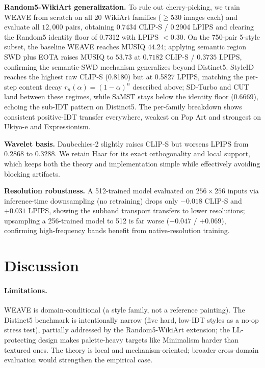 \documentclass[letterpaper]{article}
\begin{document}
\textbf{Random5-WikiArt generalization.}
To rule out cherry-picking, we train WEAVE from scratch on all 20 WikiArt families ($\ge$530 images each) and evaluate all $12{,}000$ pairs, obtaining 0.7434 CLIP-S / 0.2904 LPIPS and clearing the Random5 identity floor of 0.7312 with LPIPS $<0.30$.
On the 750-pair 5-style subset, the baseline WEAVE reaches MUSIQ $44.24$; applying semantic region SWD plus EOTA raises MUSIQ to $53.73$ at $0.7182$ CLIP-S / $0.3735$ LPIPS, confirming the semantic-SWD mechanism generalizes beyond Distinct5.
StyleID reaches the highest raw CLIP-S (0.8180) but at 0.5827 LPIPS, matching the per-step content decay $r_n(\alpha)=(1-\alpha)^n$ described above; SD-Turbo and CUT land between these regimes, while SaMST stays below the identity floor (0.6669), echoing the sub-IDT pattern on Distinct5.
The per-family breakdown shows consistent positive-IDT transfer everywhere, weakest on Pop Art and strongest on Ukiyo-e and Expressionism.

\textbf{Wavelet basis.}
Daubechies-2 slightly raises CLIP-S but worsens LPIPS from 0.2868 to 0.3288.
We retain Haar for its exact orthogonality and local support, which keeps both the theory and implementation simple while effectively avoiding blocking artifacts.

\textbf{Resolution robustness.}
A 512-trained model evaluated on $256{\times}256$ inputs via inference-time downsampling (no retraining) drops only $-0.018$ CLIP-S and $+0.031$ LPIPS, showing the subband transport transfers to lower resolutions; upsampling a 256-trained model to 512 is far worse ($-0.047$ / $+0.069$), confirming high-frequency bands benefit from native-resolution training.


\section{Discussion}

\paragraph{Limitations.}
WEAVE is domain-conditional (a style family, not a reference painting).
The Distinct5 benchmark is intentionally narrow (five hard, low-IDT styles as a no-op stress test), partially addressed by the Random5-WikiArt extension; the LL-protecting design makes palette-heavy targets like Minimalism harder than textured ones.
The theory is local and mechanism-oriented; broader cross-domain evaluation would strengthen the empirical case.
\end{document}
